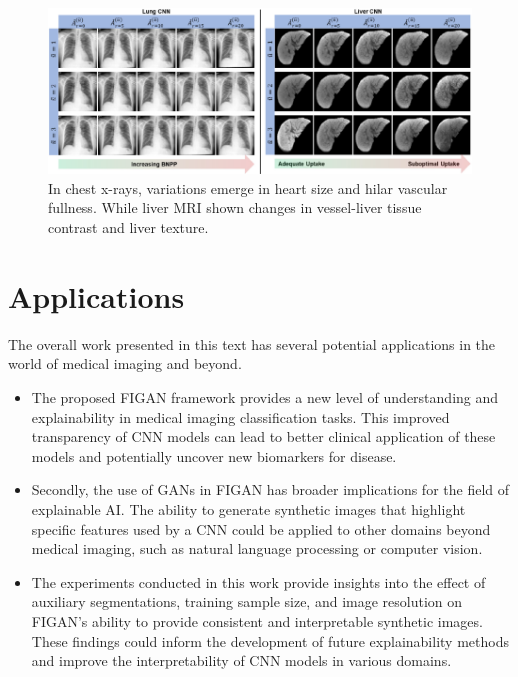 \begin{figure}[h!]
    \centering
    \includegraphics[width=\textwidth]{Images/figan_syn_imgs_seq.png}
    \caption[FIGAN Synthetic Image Sequences]{In chest x-rays, variations emerge in heart size and hilar vascular fullness. While liver MRI shown changes in vessel-liver tissue contrast and liver texture.}
\end{figure}

\clearpage

\section{Applications}

\noindent
The overall work presented in this text has several potential applications in the world of medical imaging and beyond. 

\begin{itemize}
    \item The proposed FIGAN framework provides a new level of understanding and explainability in medical imaging classification tasks. This improved transparency of CNN models can lead to better clinical application of these models and potentially uncover new biomarkers for disease. 
    
    \item Secondly, the use of GANs in FIGAN has broader implications for the field of explainable AI. The ability to generate synthetic images that highlight specific features used by a CNN could be applied to other domains beyond medical imaging, such as natural language processing or computer vision. 

    \item The experiments conducted in this work provide insights into the effect of auxiliary segmentations, training sample size, and image resolution on FIGAN's ability to provide consistent and interpretable synthetic images. These findings could inform the development of future explainability methods and improve the interpretability of CNN models in various domains. 
\end{itemize}

